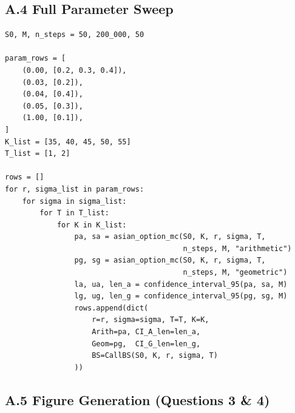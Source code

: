 \documentclass[11pt,a4paper]{article}
\theoremstyle{plain}
\theoremstyle{definition}
\begin{document}
\subsection*{A.4 \quad Full Parameter Sweep}

\begin{lstlisting}[style=pythonstyle,
  caption={Parameter sweep over all required combinations (Tables~3--4).}]
S0, M, n_steps = 50, 200_000, 50

param_rows = [
    (0.00, [0.2, 0.3, 0.4]),
    (0.03, [0.2]),
    (0.04, [0.4]),
    (0.05, [0.3]),
    (1.00, [0.1]),
]
K_list = [35, 40, 45, 50, 55]
T_list = [1, 2]

rows = []
for r, sigma_list in param_rows:
    for sigma in sigma_list:
        for T in T_list:
            for K in K_list:
                pa, sa = asian_option_mc(S0, K, r, sigma, T,
                                         n_steps, M, "arithmetic")
                pg, sg = asian_option_mc(S0, K, r, sigma, T,
                                         n_steps, M, "geometric")
                la, ua, len_a = confidence_interval_95(pa, sa, M)
                lg, ug, len_g = confidence_interval_95(pg, sg, M)
                rows.append(dict(
                    r=r, sigma=sigma, T=T, K=K,
                    Arith=pa, CI_A_len=len_a,
                    Geom=pg,  CI_G_len=len_g,
                    BS=CallBS(S0, K, r, sigma, T)
                ))
\end{lstlisting}

\subsection*{A.5 \quad Figure Generation (Questions 3 \& 4)}
\end{document}
